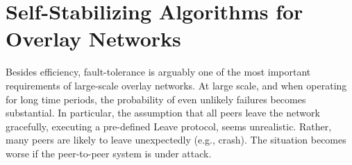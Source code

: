 \documentclass[a4paper,10pt,openany, oneside]{book}
\newcommand{\chaptertitle}{Self-Stabilizing Algorithms for Overlay Networks}
\begin{document}
% 





\mainmatter






















\chapter{\chaptertitle}
\label{cha:self_stabilizing_algorithms}

Besides efficiency, fault-tolerance is arguably one of the 
most important requirements of large-scale overlay networks. 
At large scale, and when operating for long time periods, the
probability of even unlikely failures becomes substantial.
In particular, the assumption that all peers leave the network
gracefully, executing a pre-defined {\sc Leave} protocol, seems
unrealistic.
Rather, many peers are likely to leave unexpectedly (e.g., crash). 
The situation becomes worse if the peer-to-peer system is under
attack.\\



\end{document}
